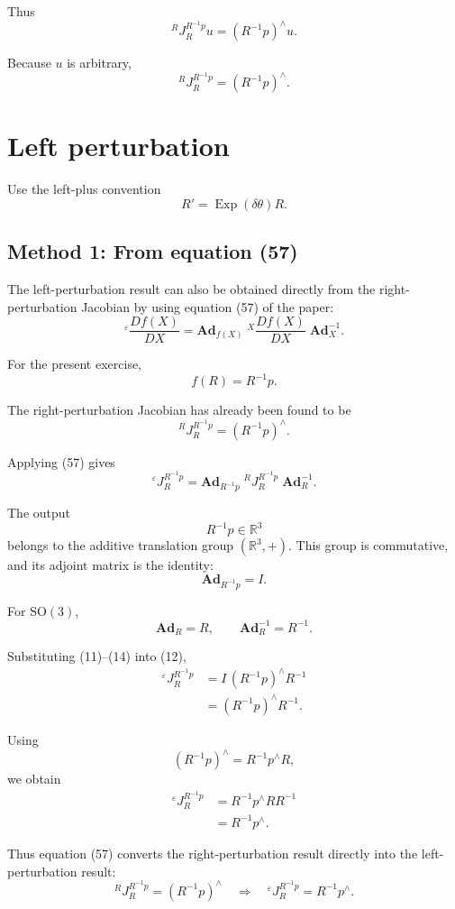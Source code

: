 \documentclass[11pt]{article}
\newcommand{\Exp}{\operatorname{Exp}}
\newcommand{\SO}{\mathrm{SO}}
\begin{document}
Thus
\[
{}^{R}J_R^{R^{-1}p}u=(R^{-1}p)^\wedge u.
\]

Because $u$ is arbitrary,
\[
\boxed{
{}^{R}J_R^{R^{-1}p}=(R^{-1}p)^\wedge.
}
\]
\section{Left perturbation}

Use the left-plus convention
\[
R'=\Exp(\delta\theta)R.
\]

\subsection{Method 1: From equation (57)}

The left-perturbation result can also be obtained directly from the
right-perturbation Jacobian by using equation (57) of the paper:
\[
\boxed{
{}^{\varepsilon}\frac{Df(X)}{DX}
=
\mathbf{Ad}_{f(X)}
\;
{}^{X}\frac{Df(X)}{DX}
\;
\mathbf{Ad}_{X}^{-1}.
}
\tag{57}
\]

For the present exercise,
\[
f(R)=R^{-1}p.
\]

The right-perturbation Jacobian has already been found to be
\[
\boxed{
{}^{R}J_R^{R^{-1}p}
=
(R^{-1}p)^\wedge.
}
\tag{11}
\]

Applying (57) gives
\[
{}^{\varepsilon}J_R^{R^{-1}p}
=
\mathbf{Ad}_{R^{-1}p}
\;
{}^{R}J_R^{R^{-1}p}
\;
\mathbf{Ad}_{R}^{-1}.
\tag{12}
\]

The output
\[
R^{-1}p\in\mathbb{R}^3
\]
belongs to the additive translation group $(\mathbb{R}^3,+)$.  This
group is commutative, and its adjoint matrix is the identity:
\[
\boxed{
\mathbf{Ad}_{R^{-1}p}=I.
}
\tag{13}
\]

For $\SO(3)$,
\[
\boxed{
\mathbf{Ad}_{R}=R,
\qquad
\mathbf{Ad}_{R}^{-1}=R^{-1}.
}
\tag{14}
\]

Substituting (11)--(14) into (12),
\begin{align}
{}^{\varepsilon}J_R^{R^{-1}p}
&=
I\,(R^{-1}p)^\wedge R^{-1}
\\
&=
(R^{-1}p)^\wedge R^{-1}.
\end{align}

Using
\[
(R^{-1}p)^\wedge
=
R^{-1}p^\wedge R,
\]
we obtain
\begin{align}
{}^{\varepsilon}J_R^{R^{-1}p}
&=
R^{-1}p^\wedge RR^{-1}
\\
&=
\boxed{
R^{-1}p^\wedge.
}
\end{align}

Thus equation (57) converts the right-perturbation result directly into
the left-perturbation result:
\[
\boxed{
{}^{R}J_R^{R^{-1}p}
=
(R^{-1}p)^\wedge
\quad\Longrightarrow\quad
{}^{\varepsilon}J_R^{R^{-1}p}
=
R^{-1}p^\wedge.
}
\]
\end{document}
